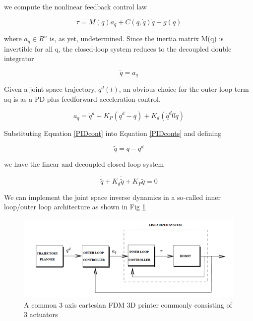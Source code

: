 \documentclass{UoNMCHA}
\numberwithin{equation}{section}
\begin{document}
we compute the nonlinear feedback control law

\begin{equation}\label{feedbacklin}
\tau = M(q)a_{q}+C(q,\dot{q})\dot{q}+g(q)
\end{equation}

where $a_q \in R^n$ is, as yet, undetermined. Since the inertia matrix M(q) is invertible for all q, the closed-loop system reduces to the decoupled double integrator  

\begin{equation}\label{PIDconts}
\ddot{q} = a_{q}
\end{equation}

Given a joint space trajectory, $q^d (t)$, an obvious choice for the outer loop term aq is as a PD plus feedforward acceleration control.  

\begin{equation}\label{PIDcont}
a_{q} = \ddot{q}^d + K_P (q^d - q) + K_d (\dot{q}^d 0 \dot{q})
\end{equation}

Substituting Equation \ref{PIDcont} into Equation \ref{PIDconts} and defining

\begin{equation}\label{PIDconts}
\tilde{q} = q - q^d
\end{equation}

we have the linear and decoupled closed loop system

\begin{equation}
\ddot{\tilde{q}} + K_d \dot{\tilde{q}} + K_P \tilde{q} = 0
\end{equation}

We can implement the joint space inverse dynamics in a so-called inner loop/outer loop architecture as shown in Fig \ref{figs/Picture3}

\begin{figure}[H]
	\begin{center}
		\includegraphics[width=.5\linewidth]{figs/Picture3}
		\caption{A  common 3 axis cartesian FDM 3D printer commonly consisting of 3 actuators}
		\label{figs/Picture3}
	\end{center}
\end{figure}
\end{document}
